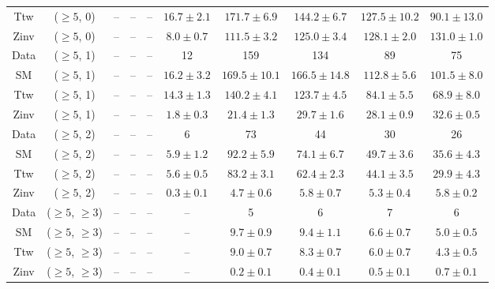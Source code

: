 \begin{table}[h!]
{\begin{tabular}{cccccccccc}
	Ttw & ($\ge5$, 0) & -- & -- & -- & $16.7\pm 2.1$ & $171.7\pm 6.9$ & $144.2\pm 6.7$ & $127.5\pm 10.2$ & $90.1\pm 13.0$ \\[0.5ex] 
	Zinv & ($\ge5$, 0) & -- & -- & -- & $8.0\pm 0.7$ & $111.5\pm 3.2$ & $125.0\pm 3.4$ & $128.1\pm 2.0$ & $131.0\pm 1.0$ \\[0.5ex] 
	Data & ($\ge5$, 1) & -- & -- & -- & 12 & 159 & 134 & 89 & 75 \\[0.5ex] 
	SM & ($\ge5$, 1) & -- & -- & -- & $16.2\pm 3.2$ & $169.5\pm 10.1$ & $166.5\pm 14.8$ & $112.8\pm 5.6$ & $101.5\pm 8.0$ \\[0.5ex] 
	Ttw & ($\ge5$, 1) & -- & -- & -- & $14.3\pm 1.3$ & $140.2\pm 4.1$ & $123.7\pm 4.5$ & $84.1\pm 5.5$ & $68.9\pm 8.0$ \\[0.5ex] 
	Zinv & ($\ge5$, 1) & -- & -- & -- & $1.8\pm 0.3$ & $21.4\pm 1.3$ & $29.7\pm 1.6$ & $28.1\pm 0.9$ & $32.6\pm 0.5$ \\[0.5ex] 
	Data & ($\ge5$, 2) & -- & -- & -- & 6 & 73 & 44 & 30 & 26 \\[0.5ex] 
	SM & ($\ge5$, 2) & -- & -- & -- & $5.9\pm 1.2$ & $92.2\pm 5.9$ & $74.1\pm 6.7$ & $49.7\pm 3.6$ & $35.6\pm 4.3$ \\[0.5ex] 
	Ttw & ($\ge5$, 2) & -- & -- & -- & $5.6\pm 0.5$ & $83.2\pm 3.1$ & $62.4\pm 2.3$ & $44.1\pm 3.5$ & $29.9\pm 4.3$ \\[0.5ex] 
	Zinv & ($\ge5$, 2) & -- & -- & -- & $0.3\pm 0.1$ & $4.7\pm 0.6$ & $5.8\pm 0.7$ & $5.3\pm 0.4$ & $5.8\pm 0.2$ \\[0.5ex] 
	Data & ($\ge5$, $\ge3$) & -- & -- & -- & -- & 5 & 6 & 7 & 6 \\[0.5ex] 
	SM & ($\ge5$, $\ge3$) & -- & -- & -- & -- & $9.7\pm 0.9$ & $9.4\pm 1.1$ & $6.6\pm 0.7$ & $5.0\pm 0.5$ \\[0.5ex] 
	Ttw & ($\ge5$, $\ge3$) & -- & -- & -- & -- & $9.0\pm 0.7$ & $8.3\pm 0.7$ & $6.0\pm 0.7$ & $4.3\pm 0.5$ \\[0.5ex] 
	Zinv & ($\ge5$, $\ge3$) & -- & -- & -- & -- & $0.2\pm 0.1$ & $0.4\pm 0.1$ & $0.5\pm 0.1$ & $0.7\pm 0.1$ \\[0.5ex] 
	\hline
	\hline
\end{tabular}}
\end{table}
